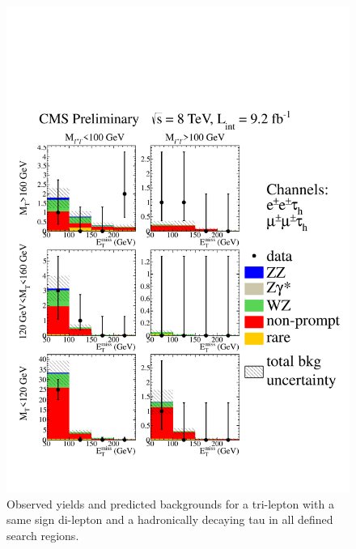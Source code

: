 \begin{figure}[htp]
\begin{center}
\includegraphics[width=1.0\textwidth]{plots/3lfinal/ossf0tau1.pdf}
\caption{Observed yields and predicted backgrounds for a tri-lepton with a same sign di-lepton 
and a hadronically decaying tau in all defined search regions.}
\label{fig:SStau1}
\end{center}
\end{figure}
